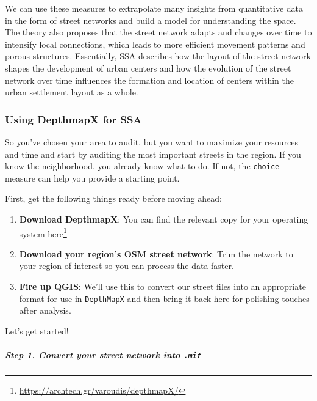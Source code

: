 \documentclass[
]{latex/krantz}
\providecommand{\tightlist}{%
  \setlength{\itemsep}{0pt}\setlength{\parskip}{0pt}}
\renewcommand{\href}[2]{#2\footnote{\url{#1}}}
\DeclareRobustCommand{\href}[2]{#2\footnote{\url{#1}}}
\begin{document}
We can use these measures to extrapolate many insights from quantitative data in the form of street networks and build a model for understanding the space. The theory also proposes that the street network adapts and changes over time to intensify local connections, which leads to more efficient movement patterns and porous structures. Essentially, SSA describes how the layout of the street network shapes the development of urban centers and how the evolution of the street network over time influences the formation and location of centers within the urban settlement layout as a whole.

\hypertarget{using-depthmapx-for-ssa}{%
\subsubsection{Using DepthmapX for SSA}\label{using-depthmapx-for-ssa}}

So you've chosen your area to audit, but you want to maximize your resources and time and start by auditing the most important streets in the region. If you know the neighborhood, you already know what to do. If not, the \texttt{choice} measure can help you provide a starting point.

First, get the following things ready before moving ahead:

\begin{enumerate}
\def\labelenumi{\arabic{enumi}.}
\tightlist
\item
  \textbf{Download DepthmapX}: You can find the relevant copy for your operating system \href{https://archtech.gr/varoudis/depthmapX/}{here}
\item
  \textbf{Download your region's OSM street network}: Trim the network to your region of interest so you can process the data faster.\\
\item
  \textbf{Fire up QGIS}: We'll use this to convert our street files into an appropriate format for use in \texttt{DepthMapX} and then bring it back here for polishing touches after analysis.
\end{enumerate}

Let's get started!

\hypertarget{step-1.-convert-your-street-network-into-.mif}{%
\subparagraph*{\texorpdfstring{Step 1. Convert your street network into \texttt{.mif}}{Step 1. Convert your street network into .mif}}\label{step-1.-convert-your-street-network-into-.mif}}
\end{document}

